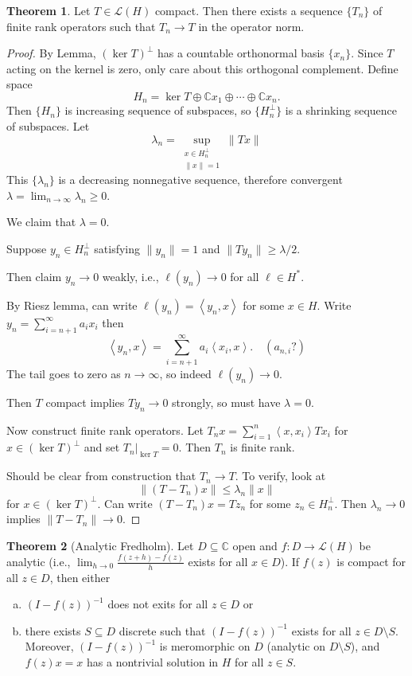 \documentclass[12pt]{article}
\theoremstyle{definition}
\newtheorem{theorem}{Theorem}
\newcommand{\C}{\mathbb{C}}
\newcommand{\LL}{\mathcal{L}}
\newcommand{\<}{\left\langle}
\renewcommand{\>}{\right\rangle}
\newcommand{\seq}{\subseteq}
\begin{document}
\begin{theorem}
    Let $T \in \LL(H)$ compact.
    Then there exists a sequence $\{T_n\}$ of finite rank operators such that $T_n \to T$ in the operator norm.
\end{theorem}

\begin{proof}
    By Lemma, $(\ker T)^\perp$ has a countable orthonormal basis $\{x_n\}$.
    Since $T$ acting on the kernel is zero, only care about this orthogonal complement.
    Define space
    \[
        H_n = \ker T \oplus \C x_1 \oplus \cdots \oplus \C x_n.
    \]
    Then $\{H_n\}$ is increasing sequence of subspaces, so $\{H_n^\perp\}$ is a shrinking sequence of subspaces.
    Let
    \[
        \lambda_n = \sup_{\substack{x \in H_n^\perp \\ \|x\|=1}} \|Tx\|
    \]
    This $\{\lambda_n\}$ is a decreasing nonnegative sequence, therefore convergent $\lambda = \lim_{n\to\infty} \lambda_n \geq 0$.

    We claim that $\lambda = 0 $.

    Suppose $y_n \in H_n^\perp$ satisfying $\|y_n\| = 1$ and $\|Ty_n\| \geq \lambda/2$.

    Then claim $y_n \to 0$ weakly, i.e., $\ell(y_n) \to 0$ for all $\ell \in H^*$.

    By Riesz lemma, can write $\ell(y_n) = \<y_n, x\>$ for some $x \in H$.
    Write $y_n = \sum_{i=n+1}^{\infty} a_i x_i$ then
    \[
        \<y_n, x\> = \sum_{i=n+1}^{\infty} a_i\<x_i, x\>.
        \quad
        (a_{n,i}?)
    \]
    The tail goes to zero as $n \to \infty$, so indeed $\ell(y_n) \to 0$.
    
    Then $T$ compact implies $Ty_n \to 0$ strongly, so must have $\lambda = 0$.

    Now construct finite rank operators.
    Let $T_nx = \sum_{i=1}^{n} \<x, x_i\> Tx_i$ for $x \in (\ker T)^\perp$ and set $T_n|_{\ker T} = 0$.
    Then $T_n$ is finite rank.

    Should be clear from construction that $T_n \to T$.
    To verify, look at
    \[
        \|(T - T_n)x\|
            \leq \lambda_n\|x\|
    \]
    for $x \in (\ker T)^\perp$.
    Can write $(T - T_n)x = Tz_n$ for some $z_n \in H_n^\perp$.
    Then $\lambda_n \to 0$ implies $\|T - T_n\| \to 0$.
\end{proof}

\begin{theorem}[Analytic Fredholm]
    Let $D \seq \C$ open and $f : D \to \LL(H)$ be analytic (i.e., $\lim_{h \to 0} \frac{f(z + h) - f(z)}{h}$ exists for all $x \in D$).
    If $f(z)$ is compact for all $z \in D$, then either 
    \begin{enumerate}[(a)]
        \item $(I - f(z))^{-1}$ does not exits for all $z \in D$ or
        \item there exists $S \seq D$ discrete such that $(I - f(z))^{-1}$ exists for all $z \in D \setminus S$.
        Moreover, $(I - f(z))^{-1}$ is meromorphic on $D$ (analytic on $D \setminus S$), and $f(z)x = x$ has a nontrivial solution in $H$ for all $z \in S$.
    \end{enumerate}
\end{theorem}
\end{document}
